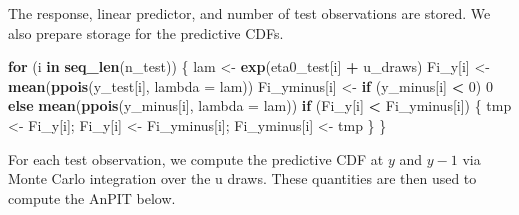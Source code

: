 \documentclass[
  letterpaper,
]{krantz}
\newenvironment{Shaded}{\begin{snugshade}}{\end{snugshade}}
\newcommand{\AttributeTok}[1]{\textcolor[rgb]{0.13,0.29,0.53}{#1}}
\newcommand{\ControlFlowTok}[1]{\textcolor[rgb]{0.13,0.29,0.53}{\textbf{#1}}}
\newcommand{\DecValTok}[1]{\textcolor[rgb]{0.00,0.00,0.81}{#1}}
\newcommand{\FloatTok}[1]{\textcolor[rgb]{0.00,0.00,0.81}{#1}}
\newcommand{\FunctionTok}[1]{\textcolor[rgb]{0.13,0.29,0.53}{\textbf{#1}}}
\newcommand{\NormalTok}[1]{#1}
\newcommand{\OtherTok}[1]{\textcolor[rgb]{0.56,0.35,0.01}{#1}}
\newcommand{\SpecialCharTok}[1]{\textcolor[rgb]{0.81,0.36,0.00}{\textbf{#1}}}
\begin{document}
The response, linear predictor, and number of test observations are
stored. We also prepare storage for the predictive CDFs.

\begin{Shaded}
\begin{Highlighting}[]
  \ControlFlowTok{for}\NormalTok{ (i }\ControlFlowTok{in} \FunctionTok{seq\_len}\NormalTok{(n\_test)) \{}
\NormalTok{    lam }\OtherTok{\textless{}{-}} \FunctionTok{exp}\NormalTok{(eta0\_test[i] }\SpecialCharTok{+}\NormalTok{ u\_draws)}
\NormalTok{    Fi\_y[i]      }\OtherTok{\textless{}{-}} \FunctionTok{mean}\NormalTok{(}\FunctionTok{ppois}\NormalTok{(y\_test[i],    }\AttributeTok{lambda =}\NormalTok{ lam))}
\NormalTok{    Fi\_yminus[i] }\OtherTok{\textless{}{-}} \ControlFlowTok{if}\NormalTok{ (y\_minus[i] }\SpecialCharTok{\textless{}} \DecValTok{0}\NormalTok{) }\DecValTok{0} \ControlFlowTok{else} \FunctionTok{mean}\NormalTok{(}\FunctionTok{ppois}\NormalTok{(y\_minus[i], }\AttributeTok{lambda =}\NormalTok{ lam))}
    \ControlFlowTok{if}\NormalTok{ (Fi\_y[i] }\SpecialCharTok{\textless{}}\NormalTok{ Fi\_yminus[i]) \{ tmp }\OtherTok{\textless{}{-}}\NormalTok{ Fi\_y[i]; Fi\_y[i] }\OtherTok{\textless{}{-}}\NormalTok{ Fi\_yminus[i]; Fi\_yminus[i] }\OtherTok{\textless{}{-}}\NormalTok{ tmp \}}
\NormalTok{  \}}
\end{Highlighting}
\end{Shaded}

For each test observation, we compute the predictive CDF at \(y\) and
\(y−1\) via Monte Carlo integration over the u draws. These quantities
are then used to compute the AnPIT below.

\begin{Shaded}
\end{Shaded}
\end{document}
